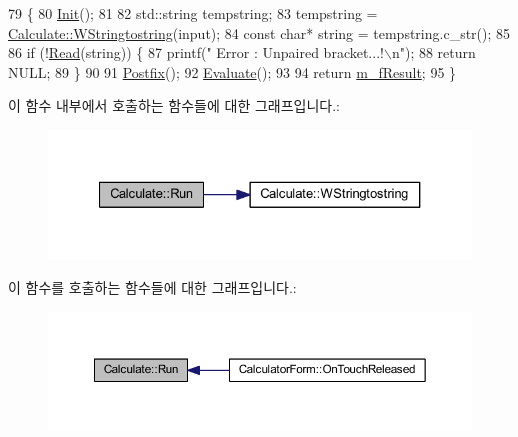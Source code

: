 \begin{DoxyCode}
79                                    \{
80     \hyperlink{class_calculate_aa8f0261822a44685b37dfe22a6eacc04}{Init}();
81 
82     std::string tempstring;
83     tempstring = \hyperlink{class_calculate_a50d0dfb999edd48ae45b8023e6a69d6a}{Calculate::WStringtostring}(input);
84     \textcolor{keyword}{const} \textcolor{keywordtype}{char}* \textcolor{keywordtype}{string} = tempstring.c\_str();
85 
86     \textcolor{keywordflow}{if} (!\hyperlink{class_calculate_a680527f598a4b37febfcdeb21dea6e9c}{Read}(\textcolor{keywordtype}{string})) \{
87         printf(\textcolor{stringliteral}{"   Error : Unpaired bracket...!\(\backslash\)n"});
88         \textcolor{keywordflow}{return} NULL;
89     \}
90 
91     \hyperlink{class_calculate_a81090066a9bc2e77432198e45850eb5d}{Postfix}();
92     \hyperlink{class_calculate_af81d8f0097a86c858825c3deef573697}{Evaluate}();
93 
94     \textcolor{keywordflow}{return} \hyperlink{class_calculate_a5ffe97b9c4358acf90360d328b9144c0}{m\_fResult};
95 \}
\end{DoxyCode}


이 함수 내부에서 호출하는 함수들에 대한 그래프입니다.\+:
\nopagebreak
\begin{figure}[H]
\begin{center}
\leavevmode
\includegraphics[width=327pt]{class_calculate_a0ad76f7ee31bea1dec46e560d10fca75_cgraph}
\end{center}
\end{figure}




이 함수를 호출하는 함수들에 대한 그래프입니다.\+:
\nopagebreak
\begin{figure}[H]
\begin{center}
\leavevmode
\includegraphics[width=350pt]{class_calculate_a0ad76f7ee31bea1dec46e560d10fca75_icgraph}
\end{center}
\end{figure}


